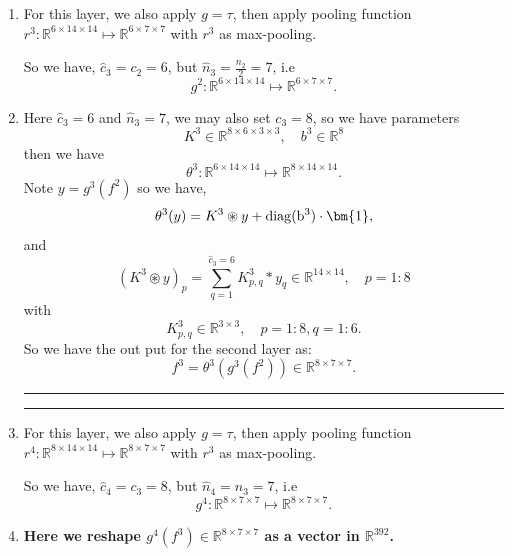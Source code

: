 \begin{enumerate}
	\bigskip \hrule \bigskip  
	\bigskip \hrule \bigskip  
	\item For this layer, we also apply $g = \tau$, then apply pooling function $r^3: \mathbb R^{6 \times 14 \times 14} \mapsto \mathbb R^{6 \times 7 \times 7} $ with $r^3$ as max-pooling.
	
	So we have, $\hat c_3 = c_2 = 6$, but $\hat n_3 = \frac{ n_2}{2} = 7$, i.e
	\begin{equation}
	g^2: \mathbb R^{6 \times 14 \times 14} \mapsto \mathbb R^{6\times 7 \times 7}.
	\end{equation}
	
	
	\item Here $\hat c_3 = 6$ and $\hat n_3 = 7$, we may also set $c_3 = 8$, so we have parameters 
	$$
	K^3 \in \mathbb R^{8 \times 6 \times 3 \times 3},\quad b^3 \in \mathbb R^{8}
	$$
	then we have 
	\begin{equation}
	\theta^3: \mathbb R^{6 \times 14 \times 14} \mapsto \mathbb R^{8 \times 14 \times 14}.
	\end{equation}
	Note $y = g^3 (f^2)$ so we have,
	\begin{equation}
	\theta^3(y) = K^3 \circledast y + {\rm{diag}(b^3)} \cdot \bm{1}, 
	\end{equation}
	and 
	\begin{equation}
	(K^3 \circledast y)_p = \sum_{q = 1}^{\hat c_3 = 6} K^3_{p,q} \ast y_q \in \mathbb R^{14 \times 14}, \quad p = 1:8
	\end{equation}
	with 
	$$
	K^3_{p,q} \in \mathbb R^{3 \times 3},\quad p = 1:8, q = 1:6.
	$$
	So we have the out put for the second layer as:
	\begin{equation}
	f^3 = \theta^3(g^3(f^2)) \in \mathbb R^{8 \times 7 \times 7}.
	\end{equation}
	
	
	\bigskip \hrule \bigskip  
	\bigskip \hrule \bigskip
	\item For this layer, we also apply $g = \tau$, then apply pooling function $r^4: \mathbb R^{8 \times 14 \times 14} \mapsto \mathbb R^{8 \times 7 \times 7} $ with $r^3$ as max-pooling.
	
	So we have, $\hat c_4 = c_3 = 8$, but $\hat n_4 =  n_3 = 7$, i.e
	\begin{equation}
	g^4: \mathbb R^{8 \times 7\times 7} \mapsto \mathbb R^{8 \times 7 \times 7}.
	\end{equation}
	
	\item {\bf Here we reshape $g^4(f^3) \in \mathbb R^{8 \times 7 \times 7}$ as a vector in $\mathbb{R}^{392}$.}
	

\end{enumerate}
